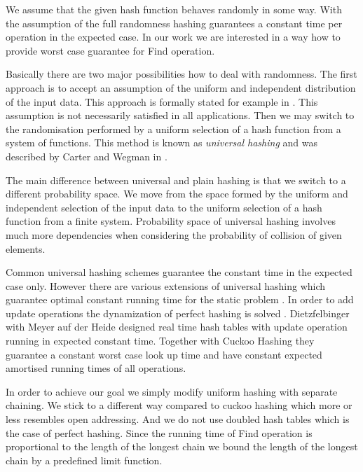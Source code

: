 \documentclass[runningheads,a4paper]{llncs}
\begin{document}
We assume that the given hash function behaves randomly in some way. With the assumption of the full randomness hashing guarantees a constant time per operation in the expected case. In our work we are interested in a way how to provide worst case guarantee for Find operation.

Basically there are two major possibilities how to deal with randomness. The first approach is to accept an assumption of the uniform and independent distribution of the input data. This approach is formally stated for example in \cite{DBLP:books/sp/Mehlhorn84}. This assumption is not necessarily satisfied in all applications. Then we may switch to the randomisation performed by a uniform selection of a hash function from a system of functions. This method is known as \emph{universal hashing} and was described by Carter and Wegman in \cite{DBLP:journals/jcss/CarterW79}. 

The main difference between universal and plain hashing is that we switch to a different probability space. We move from the space formed by the uniform and independent selection of the input data to the uniform selection of a hash function from a finite system. Probability space of universal hashing involves much more dependencies when considering the probability of collision of given elements.

Common universal hashing schemes guarantee the constant time in the expected case only. However there are various extensions of universal hashing which guarantee optimal constant running time for the static problem \cite{Fredman:1984:SST:828.1884}. In order to add update operations the dynamization of perfect hashing is solved \cite{DBLP:journals/siamcomp/DietzfelbingerKMHRT94}. Dietzfelbinger with Meyer auf der Heide designed real time hash tables \cite{DBLP:conf/icalp/DietzfelbingerH90} with update operation running in expected constant time. Together with Cuckoo Hashing \cite{DBLP:conf/esa/PaghR01} they guarantee a constant worst case look up time and have constant expected amortised running times of all operations.

In order to achieve our goal we simply modify uniform hashing with separate chaining. We stick to a different way compared to cuckoo hashing which more or less resembles open addressing. And we do not use doubled hash tables which is the case of perfect hashing. Since the running time of Find operation is proportional to the length of the longest chain we bound the length of the longest chain by a predefined limit function.
\end{document}
